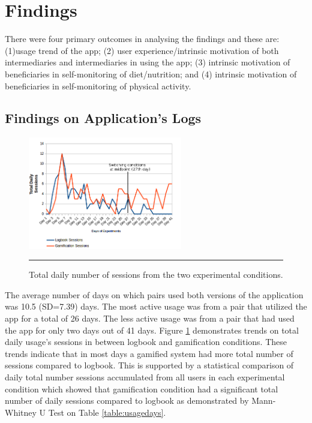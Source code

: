 \section{Findings}
There were four primary outcomes in analysing the findings and these are: (1)usage trend of the app; (2) user experience/intrinsic motivation  of both intermediaries and intermediaries in using the app; (3) intrinsic motivation of beneficiaries in self-monitoring of diet/nutrition; and (4) intrinsic motivation of beneficiaries in self-monitoring of physical activity.
\subsection{Findings on Application's Logs}
\label{usageoutcome}
\begin{figure}[htbp]
  \centering
    \includegraphics[width=0.6\textwidth]{Figures/scatter_daily_sessions.png}
    \rule{35em}{0.5pt}
  \caption{Total daily number of sessions from the two experimental conditions.}
  \label{figure:usagedailysessions}
\end{figure}
The average number of days on which pairs used both versions of the application was 10.5 (SD=7.39) days. The most active usage was from a pair that utilized the app for a total of 26 days. The less active usage was from a pair that had used the app for only two days out of 41 days. Figure \ref{figure:usagedailysessions} demonstrates trends on total daily usage's sessions in between logbook and gamification conditions. These trends indicate that in most days a gamified system had more total number of sessions compared to logbook. This is supported by a statistical comparison of daily total number sessions accumulated from all users in each experimental condition which showed that gamification condition had a significant total number of daily sessions compared to logbook as demonstrated by Mann-Whitney U Test on Table \ref{table:usagedays}.
